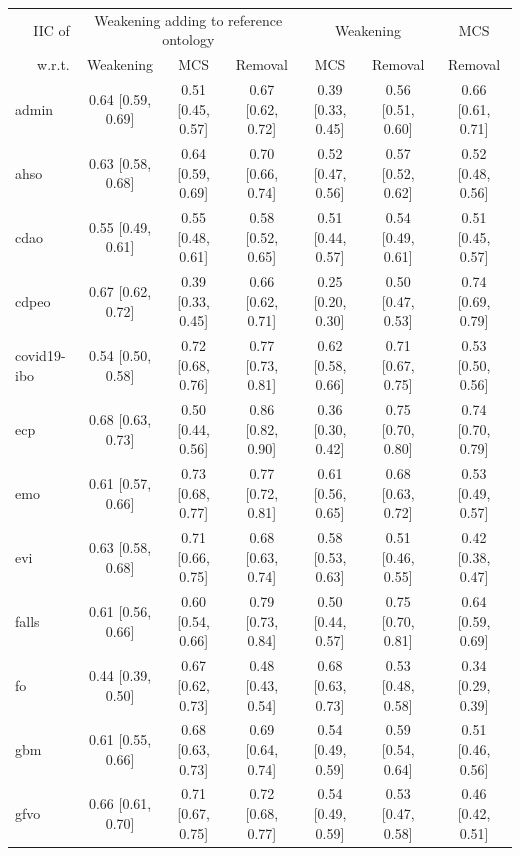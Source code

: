 
\begin{table}[htbp]
  \scriptsize
  \begin{widepage}
    \centering
    \begin{tabular}{|l|cccccc|}
      \cline{2-7}
      \multicolumn{1}{r|}{IIC of} & \multicolumn{3}{c}{Weakening adding to reference ontology} & \multicolumn{2}{c}{Weakening} & MCS \\
      \multicolumn{1}{r|}{w.r.t.} & Weakening & MCS & Removal & MCS & Removal & Removal \\
      \hline
      admin & 0.64 [0.59, 0.69] & 0.51 [0.45, 0.57] & 0.67 [0.62, 0.72] & 0.39 [0.33, 0.45] & 0.56 [0.51, 0.60] & 0.66 [0.61, 0.71] \\
      ahso & 0.63 [0.58, 0.68] & 0.64 [0.59, 0.69] & 0.70 [0.66, 0.74] & 0.52 [0.47, 0.56] & 0.57 [0.52, 0.62] & 0.52 [0.48, 0.56] \\
      cdao & 0.55 [0.49, 0.61] & 0.55 [0.48, 0.61] & 0.58 [0.52, 0.65] & 0.51 [0.44, 0.57] & 0.54 [0.49, 0.61] & 0.51 [0.45, 0.57] \\
      cdpeo & 0.67 [0.62, 0.72] & 0.39 [0.33, 0.45] & 0.66 [0.62, 0.71] & 0.25 [0.20, 0.30] & 0.50 [0.47, 0.53] & 0.74 [0.69, 0.79] \\
      covid19-ibo & 0.54 [0.50, 0.58] & 0.72 [0.68, 0.76] & 0.77 [0.73, 0.81] & 0.62 [0.58, 0.66] & 0.71 [0.67, 0.75] & 0.53 [0.50, 0.56] \\
      ecp & 0.68 [0.63, 0.73] & 0.50 [0.44, 0.56] & 0.86 [0.82, 0.90] & 0.36 [0.30, 0.42] & 0.75 [0.70, 0.80] & 0.74 [0.70, 0.79] \\
      emo & 0.61 [0.57, 0.66] & 0.73 [0.68, 0.77] & 0.77 [0.72, 0.81] & 0.61 [0.56, 0.65] & 0.68 [0.63, 0.72] & 0.53 [0.49, 0.57] \\
      evi & 0.63 [0.58, 0.68] & 0.71 [0.66, 0.75] & 0.68 [0.63, 0.74] & 0.58 [0.53, 0.63] & 0.51 [0.46, 0.55] & 0.42 [0.38, 0.47] \\
      falls & 0.61 [0.56, 0.66] & 0.60 [0.54, 0.66] & 0.79 [0.73, 0.84] & 0.50 [0.44, 0.57] & 0.75 [0.70, 0.81] & 0.64 [0.59, 0.69] \\
      fo & 0.44 [0.39, 0.50] & 0.67 [0.62, 0.73] & 0.48 [0.43, 0.54] & 0.68 [0.63, 0.73] & 0.53 [0.48, 0.58] & 0.34 [0.29, 0.39] \\
      gbm & 0.61 [0.55, 0.66] & 0.68 [0.63, 0.73] & 0.69 [0.64, 0.74] & 0.54 [0.49, 0.59] & 0.59 [0.54, 0.64] & 0.51 [0.46, 0.56] \\
      gfvo & 0.66 [0.61, 0.70] & 0.71 [0.67, 0.75] & 0.72 [0.68, 0.77] & 0.54 [0.49, 0.59] & 0.53 [0.47, 0.58] & 0.46 [0.42, 0.51] \\

\end{tabular}
\end{widepage}
\end{table}

